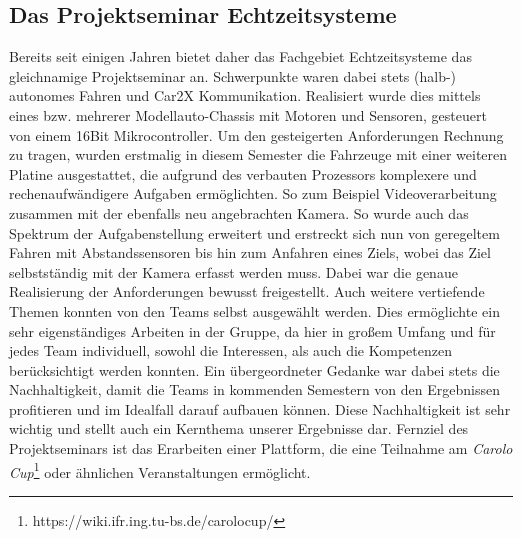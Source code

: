 \subsection{Das Projektseminar Echtzeitsysteme}
Bereits seit einigen Jahren bietet daher das Fachgebiet Echtzeitsysteme das gleichnamige Projektseminar an. Schwerpunkte waren dabei stets (halb-) autonomes Fahren und Car2X Kommunikation. Realisiert wurde dies mittels eines bzw. mehrerer Modellauto-Chassis mit Motoren und Sensoren, gesteuert von einem 16Bit Mikrocontroller. Um den gesteigerten Anforderungen Rechnung zu tragen, wurden erstmalig in diesem Semester die Fahrzeuge mit einer weiteren Platine ausgestattet, die aufgrund des verbauten Prozessors komplexere und rechenaufwändigere Aufgaben ermöglichten. So zum Beispiel Videoverarbeitung zusammen mit der ebenfalls neu angebrachten Kamera. So wurde auch das Spektrum der Aufgabenstellung erweitert und erstreckt sich nun von geregeltem Fahren mit Abstandssensoren bis hin zum Anfahren eines Ziels, wobei das Ziel selbstständig mit der Kamera erfasst werden muss. Dabei war die genaue Realisierung der Anforderungen bewusst freigestellt. Auch weitere vertiefende Themen konnten von den Teams selbst ausgewählt werden. Dies ermöglichte ein sehr eigenständiges Arbeiten in der Gruppe, da hier in großem Umfang und für jedes Team individuell, sowohl die Interessen, als auch die Kompetenzen berücksichtigt werden konnten.
\pagebreak \newline
Ein übergeordneter Gedanke war dabei stets die Nachhaltigkeit, damit die Teams in kommenden Semestern von den Ergebnissen profitieren und im Idealfall darauf aufbauen können. Diese Nachhaltigkeit ist sehr wichtig und stellt auch ein Kernthema unserer Ergebnisse dar. Fernziel des Projektseminars ist das Erarbeiten einer Plattform, die eine Teilnahme am \textit{Carolo Cup}\footnote[1]{https://wiki.ifr.ing.tu-bs.de/carolocup/} oder ähnlichen Veranstaltungen ermöglicht.
